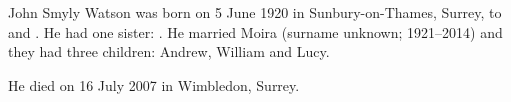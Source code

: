 
John Smyly Watson was born on 5 June 1920 in	Sunbury-on-Thames, Surrey, to  and .
He had one sister: .
He married Moira (surname unknown; 1921--2014) and they had three children: Andrew, William and Lucy.

He died on 16 July 2007 in Wimbledon, Surrey.
